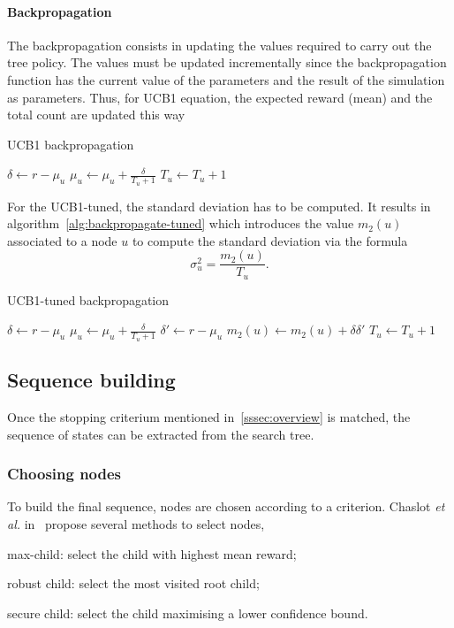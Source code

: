 \documentclass[oneside,twocolumn]{article}
\begin{document}
\paragraph{Backpropagation}
The backpropagation consists in updating the values required to carry out the
tree policy. The values must be updated incrementally since the backpropagation
function has the current value of the parameters and the result of the
simulation as parameters. Thus, for UCB1 equation, the expected reward (mean)
and the total count are updated this way
\begin{algorithm}
  \caption{UCB1 backpropagation}
  \begin{algorithmic}
    \State{}\(\delta \gets r - \mu_u\)
    \State{}\(\mu_u \gets \mu_u + \frac{\delta}{T_u + 1}\)
    \State{}\(T_u \gets T_u + 1\)
    \EndProcedure{}
  \end{algorithmic}
\end{algorithm}

For the UCB1-tuned, the standard deviation has to be computed. It results in
algorithm~\ref{alg:backpropagate-tuned} which introduces the value \(m_2(u)\)
associated to a node \(u\) to compute the standard deviation via the formula
\begin{equation}
  \sigma^2_u = \frac{m_2(u)}{T_u}.
\end{equation}
\begin{algorithm}
  \caption{UCB1-tuned backpropagation}\label{alg:backpropagate-tuned}
  \begin{algorithmic}
    \State{}\(\delta \gets r - \mu_u\)
    \State{}\(\mu_u \gets \mu_u + \frac{\delta}{T_u + 1}\)
    \State{}\(\delta' \gets r - \mu_u\)
    \State{}\(m_2(u) \gets m_2(u) + \delta \delta'\)
    \State{}\(T_u \gets T_u + 1\)
    \EndProcedure{}
  \end{algorithmic}
\end{algorithm}


\subsection{Sequence building}
Once the stopping criterium mentioned in~\ref{sssec:overview} is matched, the
sequence of states can be extracted from the search tree.

\subsubsection{Choosing nodes}\label{sssec:node_selection}
To build the final sequence, nodes are chosen according to a criterion.
Chaslot \textit{et al.} in~\cite{chaslot2008progstrat} propose several
methods to select nodes,
\begin{compactitem}
  \item max-child: select the child with highest mean reward;
  \item robust child: select the most visited root child;
  \item secure child: select the child maximising a lower confidence bound.
\end{compactitem}
\end{document}
